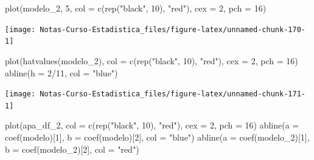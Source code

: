\documentclass[
  12pt,
]{book}
\newenvironment{Shaded}{\begin{snugshade}}{\end{snugshade}}
\newcommand{\AttributeTok}[1]{\textcolor[rgb]{0.77,0.63,0.00}{#1}}
\newcommand{\DecValTok}[1]{\textcolor[rgb]{0.00,0.00,0.81}{#1}}
\newcommand{\FunctionTok}[1]{\textcolor[rgb]{0.00,0.00,0.00}{#1}}
\newcommand{\NormalTok}[1]{#1}
\newcommand{\SpecialCharTok}[1]{\textcolor[rgb]{0.00,0.00,0.00}{#1}}
\newcommand{\StringTok}[1]{\textcolor[rgb]{0.31,0.60,0.02}{#1}}
\theoremstyle{definition}
\theoremstyle{definition}
\theoremstyle{definition}
\theoremstyle{definition}
\theoremstyle{remark}
\begin{document}
\begin{Shaded}
\begin{Highlighting}[]
\FunctionTok{plot}\NormalTok{(modelo\_2, }\DecValTok{5}\NormalTok{, }\AttributeTok{col =} \FunctionTok{c}\NormalTok{(}\FunctionTok{rep}\NormalTok{(}\StringTok{"black"}\NormalTok{, }\DecValTok{10}\NormalTok{), }\StringTok{"red"}\NormalTok{),}
    \AttributeTok{cex =} \DecValTok{2}\NormalTok{, }\AttributeTok{pch =} \DecValTok{16}\NormalTok{)}
\end{Highlighting}
\end{Shaded}

\begin{center}\texttt{[image: Notas-Curso-Estadistica\_files/figure-latex/unnamed-chunk-170-1]} \end{center}

\begin{Shaded}
\begin{Highlighting}[]
\FunctionTok{plot}\NormalTok{(}\FunctionTok{hatvalues}\NormalTok{(modelo\_2), }\AttributeTok{col =} \FunctionTok{c}\NormalTok{(}\FunctionTok{rep}\NormalTok{(}\StringTok{"black"}\NormalTok{, }\DecValTok{10}\NormalTok{),}
    \StringTok{"red"}\NormalTok{), }\AttributeTok{cex =} \DecValTok{2}\NormalTok{, }\AttributeTok{pch =} \DecValTok{16}\NormalTok{)}
\FunctionTok{abline}\NormalTok{(}\AttributeTok{h =} \DecValTok{2}\SpecialCharTok{/}\DecValTok{11}\NormalTok{, }\AttributeTok{col =} \StringTok{"blue"}\NormalTok{)}
\end{Highlighting}
\end{Shaded}

\begin{center}\texttt{[image: Notas-Curso-Estadistica\_files/figure-latex/unnamed-chunk-171-1]} \end{center}

\begin{Shaded}
\begin{Highlighting}[]
\FunctionTok{plot}\NormalTok{(apa\_df\_2, }\AttributeTok{col =} \FunctionTok{c}\NormalTok{(}\FunctionTok{rep}\NormalTok{(}\StringTok{"black"}\NormalTok{, }\DecValTok{10}\NormalTok{), }\StringTok{"red"}\NormalTok{), }\AttributeTok{cex =} \DecValTok{2}\NormalTok{,}
    \AttributeTok{pch =} \DecValTok{16}\NormalTok{)}
\FunctionTok{abline}\NormalTok{(}\AttributeTok{a =} \FunctionTok{coef}\NormalTok{(modelo)[}\DecValTok{1}\NormalTok{], }\AttributeTok{b =} \FunctionTok{coef}\NormalTok{(modelo)[}\DecValTok{2}\NormalTok{], }\AttributeTok{col =} \StringTok{"blue"}\NormalTok{)}
\FunctionTok{abline}\NormalTok{(}\AttributeTok{a =} \FunctionTok{coef}\NormalTok{(modelo\_2)[}\DecValTok{1}\NormalTok{], }\AttributeTok{b =} \FunctionTok{coef}\NormalTok{(modelo\_2)[}\DecValTok{2}\NormalTok{],}
    \AttributeTok{col =} \StringTok{"red"}\NormalTok{)}
\end{Highlighting}
\end{Shaded}
\end{document}
